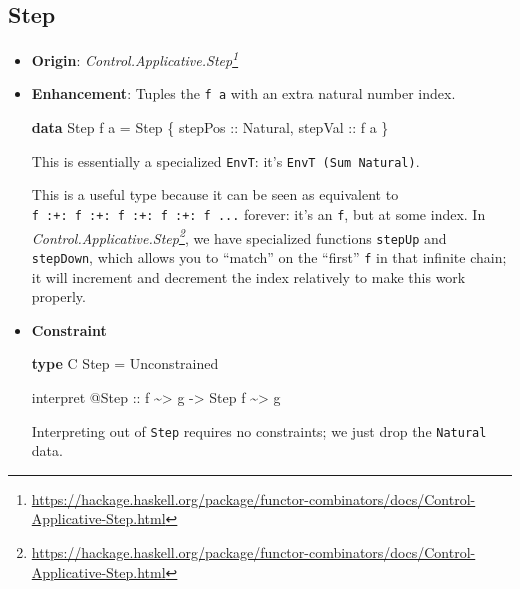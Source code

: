 \documentclass[]{article}
\newenvironment{Shaded}{}{}
\newcommand{\DataTypeTok}[1]{\textcolor[rgb]{0.56,0.13,0.00}{#1}}
\newcommand{\KeywordTok}[1]{\textcolor[rgb]{0.00,0.44,0.13}{\textbf{#1}}}
\newcommand{\NormalTok}[1]{#1}
\newcommand{\OperatorTok}[1]{\textcolor[rgb]{0.40,0.40,0.40}{#1}}
\newcommand{\OtherTok}[1]{\textcolor[rgb]{0.00,0.44,0.13}{#1}}
\renewcommand{\href}[2]{#2\footnote{\url{#1}}}
\begin{document}
\hypertarget{step}{%
\subsection{Step}\label{step}}

\begin{itemize}
\item
  \textbf{Origin}:
  \emph{\href{https://hackage.haskell.org/package/functor-combinators/docs/Control-Applicative-Step.html}{Control.Applicative.Step}}
\item
  \textbf{Enhancement}: Tuples the \texttt{f\ a} with an extra natural number
  index.

\begin{Shaded}
\begin{Highlighting}[]
\KeywordTok{data} \DataTypeTok{Step}\NormalTok{ f a }\OtherTok{=} \DataTypeTok{Step}\NormalTok{ \{}\OtherTok{ stepPos ::} \DataTypeTok{Natural}\NormalTok{,}\OtherTok{ stepVal ::}\NormalTok{ f a \}}
\end{Highlighting}
\end{Shaded}

  This is essentially a specialized \texttt{EnvT}: it's
  \texttt{EnvT\ (Sum\ Natural)}.

  This is a useful type because it can be seen as equivalent to
  \texttt{f\ :+:\ f\ :+:\ f\ :+:\ f\ :+:\ f\ ...} forever: it's an \texttt{f},
  but at some index. In
  \emph{\href{https://hackage.haskell.org/package/functor-combinators/docs/Control-Applicative-Step.html}{Control.Applicative.Step}},
  we have specialized functions \texttt{stepUp} and \texttt{stepDown}, which
  allows you to ``match'' on the ``first'' \texttt{f} in that infinite chain; it
  will increment and decrement the index relatively to make this work properly.
\item
  \textbf{Constraint}

\begin{Shaded}
\begin{Highlighting}[]
\KeywordTok{type} \DataTypeTok{C} \DataTypeTok{Step} \OtherTok{=} \DataTypeTok{Unconstrained}

\NormalTok{interpret }\OperatorTok{@}\DataTypeTok{Step}
\OtherTok{    ::}\NormalTok{ f }\OperatorTok{\textasciitilde{}>}\NormalTok{ g}
    \OtherTok{{-}>} \DataTypeTok{Step}\NormalTok{ f }\OperatorTok{\textasciitilde{}>}\NormalTok{ g}
\end{Highlighting}
\end{Shaded}

  Interpreting out of \texttt{Step} requires no constraints; we just drop the
  \texttt{Natural} data.
\end{itemize}
\end{document}
